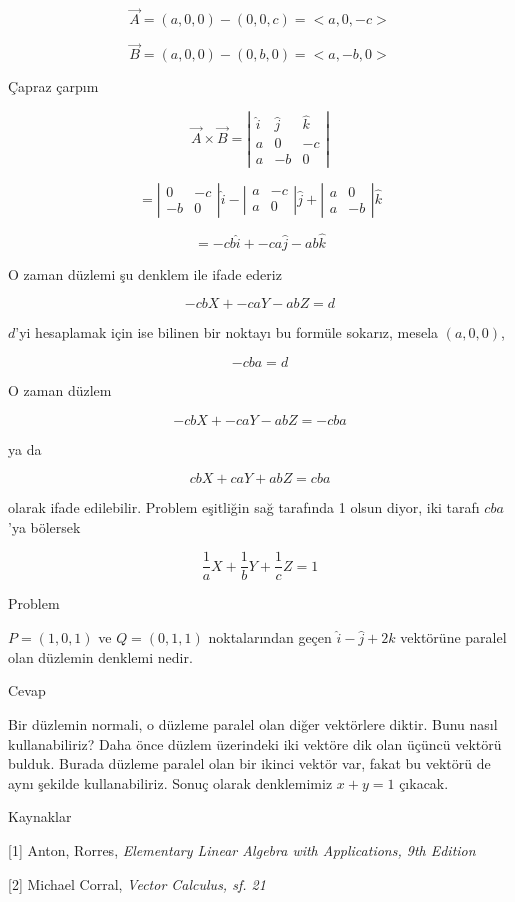 \documentclass[12pt,fleqn]{article}\usepackage{../../common}
\begin{document}
$$ \vec{A} = (a,0,0) - (0,0,c) = <a,0,-c>$$

$$ \vec{B} = (a,0,0) - (0,b,0) = <a,-b,0>$$

Çapraz çarpım

$$ \vec{A} \times \vec{B} =
\left|\begin{array}{rrr}
\hat{i}& \hat{j}& \hat{k} \\
a & 0 & -c \\
a & -b & 0 
\end{array}\right|
 $$

$$ = 
\left|\begin{array}{rr}
0 & -c \\
-b & 0
\end{array}\right| 
\hat{i}
-
\left|\begin{array}{rr}
a & -c \\
a & 0
\end{array}\right|
\hat{j}
+
\left|\begin{array}{rr}
a & 0 \\
a & -b
\end{array}\right|
\hat{k}
$$

$$ = -cb\hat{i} + -ca\hat{j} -ab \hat{k} $$

O zaman düzlemi şu denklem ile ifade ederiz 

$$ -cbX + -caY -abZ = d $$

$d$'yi hesaplamak için ise bilinen bir noktayı bu formüle sokarız, mesela
$(a,0,0)$, 

$$ -cba  = d $$

O zaman düzlem

$$ -cbX + -caY -abZ = -cba $$

ya da

$$ cbX + caY + abZ = cba $$

olarak ifade edilebilir. Problem eşitliğin sağ tarafında 1 olsun diyor, iki 
tarafı $cba$'ya bölersek

$$ \frac{1}{a}X + \frac{1}{b}Y + \frac{1}{c}Z = 1 $$

Problem

$P=(1,0,1)$ ve $Q=(0,1,1)$ noktalarından geçen $\hat{i}-\hat{j}+2\hat{k}$
vektörüne paralel olan düzlemin denklemi nedir.

Cevap

Bir düzlemin normali, o düzleme paralel olan diğer vektörlere diktir. Bunu nasıl
kullanabiliriz? Daha önce düzlem üzerindeki iki vektöre dik olan üçüncü vektörü
bulduk. Burada düzleme paralel olan bir ikinci vektör var, fakat bu vektörü de
aynı şekilde kullanabiliriz. Sonuç olarak denklemimiz $x+y =1$ çıkacak.

Kaynaklar

[1] Anton, Rorres, {\em Elementary Linear Algebra with Applications, 9th 
Edition}

[2] Michael Corral, {\em Vector Calculus, sf. 21}
\end{document}
